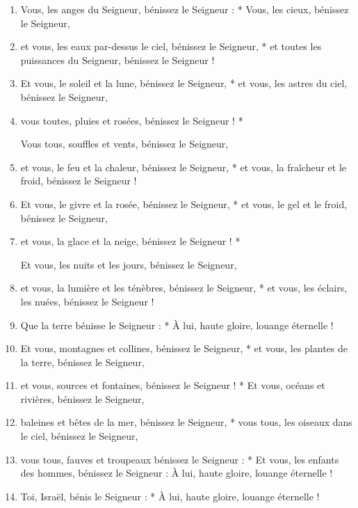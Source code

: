 \documentclass[twoside]{article}
\begin{document}
\begin{paracol}[1]{2}
\begin{enumerate}[wide, itemsep=0mm, labelwidth=!, labelindent=0pt, label=\color{gregoriocolor}\theenumi]
\item Vous, les anges du Seigneur,
   bénissez le Seigneur : *
 Vous, les cieux,
   bénissez le Seigneur,
   
\item et vous, les eaux par-dessus le ciel,
   bénissez le Seigneur, *
    et toutes les puissances du Seigneur,
   bénissez le Seigneur !

\item Et vous, le soleil et la lune,
   bénissez le Seigneur, *
et vous, les astres du ciel, 
   bénissez le Seigneur,
\item vous toutes, pluies et rosées,
   bénissez le Seigneur ! *

 Vous tous, souffles et vents,
   bénissez le Seigneur,
\item et vous, le feu et la chaleur,
   bénissez le Seigneur, *
et vous, la fraîcheur et le froid,
   bénissez le Seigneur !

\item Et vous, le givre et la rosée,
   bénissez le Seigneur, *
et vous, le gel et le froid,
   bénissez le Seigneur,
\item et vous, la glace et la neige,
   bénissez le Seigneur ! *

Et vous, les nuits et les jours,
   bénissez le Seigneur,
\item et vous, la lumière et les ténèbres,
   bénissez le Seigneur, *
et vous, les éclairs, les nuées,
   bénissez le Seigneur !

\item Que la terre bénisse le Seigneur : *
À lui, haute gloire, louange éternelle !

\item Et vous, montagnes et collines,
   bénissez le Seigneur, *
et vous, les plantes de la terre,
   bénissez le Seigneur,
   
\item et vous, sources et fontaines,
   bénissez le Seigneur ! *
 Et vous, océans et rivières,
   bénissez le Seigneur,
   
\item baleines et bêtes de la mer,
   bénissez le Seigneur, *
vous tous, les oiseaux dans le ciel,
   bénissez le Seigneur,
   
\item vous tous, fauves et troupeaux
   bénissez le Seigneur : *
Et vous, les enfants des hommes,
   bénissez le Seigneur :
À lui, haute gloire, louange éternelle !

\item Toi, Israël,
   bénis le Seigneur : *
À lui, haute gloire, louange éternelle !


\end{enumerate}
\end{paracol}
\end{document}
